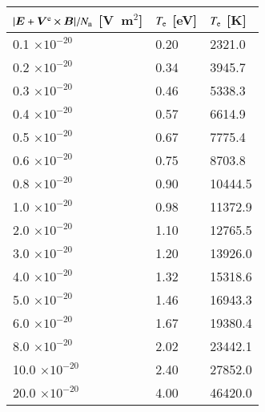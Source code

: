 \documentclass{warpdoc}
\renewcommand{\fontsizetable}{\footnotesize\scalefont{1.0}}
\renewcommand{\vec}[1]{\bm{#1}}
\begin{document}
%
\begin{table*}
  \center\fontsizetable
  \begin{threeparttable}
    \label{tab:Te}
    \fontsizetable
    \begin{tabular*}{\textwidth}{l@{\hspace{0.13\textwidth}}l@{\hspace{0.1\textwidth}}l}
    \toprule
    $|\vec{E}+\vec{V}^{\rm e} \times \vec{B}|/N_{\rm n}$ [V~m$^2$]  & $T_{\rm e}$ [eV]   &  $T_{\rm e}$ [K] \\
    \midrule
      0.1 $\times 10^{-20}$    &  0.20          &  2321.0\\
      0.2 $\times 10^{-20}$    &  0.34          &  3945.7\\
      0.3 $\times 10^{-20}$    &  0.46          &  5338.3\\
      0.4 $\times 10^{-20}$    &  0.57          &  6614.9\\
      0.5 $\times 10^{-20}$    &  0.67          &  7775.4\\
      0.6 $\times 10^{-20}$    &  0.75          &  8703.8\\
      0.8 $\times 10^{-20}$    &  0.90          & 10444.5\\
      1.0 $\times 10^{-20}$    &  0.98          & 11372.9\\
      2.0 $\times 10^{-20}$    &  1.10          & 12765.5\\
      3.0 $\times 10^{-20}$    &  1.20          & 13926.0\\
      4.0 $\times 10^{-20}$    &  1.32          & 15318.6\\
      5.0 $\times 10^{-20}$    &  1.46          & 16943.3\\
      6.0 $\times 10^{-20}$    &  1.67          & 19380.4\\
      8.0 $\times 10^{-20}$    &  2.02          & 23442.1\\
     10.0 $\times 10^{-20}$    &  2.40          & 27852.0\\
     20.0 $\times 10^{-20}$    &  4.00          & 46420.0\\
    \bottomrule
    \end{tabular*}
   \end{threeparttable}
\end{table*}
%
\end{document}
